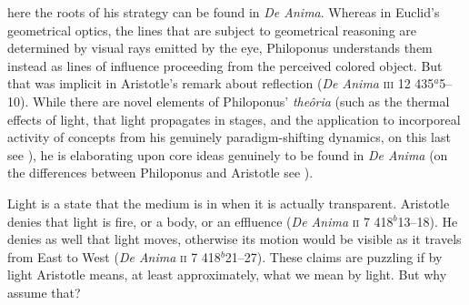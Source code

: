 here the roots of his strategy can be found in \emph{De Anima}. Whereas in Euclid's geometrical optics, the lines that are subject to geometrical reasoning are determined by visual rays emitted by the eye, Philoponus understands them instead as lines of influence proceeding from the perceived colored object. But that was implicit in Aristotle's remark about reflection (\emph{De Anima} \textsc{iii} 12 435\( ^{a} \)5--10). While there are novel elements of Philoponus' \emph{theôria} (such as the thermal effects of light, that light propagates in stages, and the application to incorporeal activity of concepts from his genuinely paradigm-shifting dynamics, on this last see \citealt{Kuhn:1962ss,Wolff:1987vn}), he is elaborating upon core ideas genuinely to be found in \emph{De Anima} (on the differences between Philoponus and Aristotle see \citealt{Groot:1983fa}).

Light is a state that the medium is in when it is actually transparent. Aristotle denies that light is fire, or a body, or an effluence (\emph{De Anima} \textsc{ii} 7 418\( ^{b} \)13--18). He denies as well that light moves, otherwise its motion would be visible as it travels from East to West (\emph{De Anima} \textsc{ii} 7 418\( ^{b} \)21--27). These claims are puzzling if by light Aristotle means, at least approximately, what we mean by light. But why assume that? 

